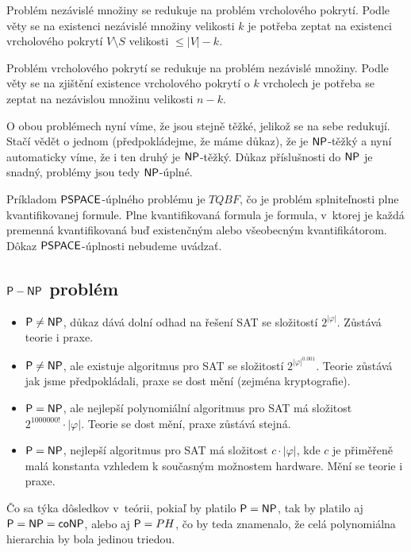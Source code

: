 Problém nezávislé množiny se redukuje na problém vrcholového pokrytí.
Podle věty se na existenci nezávislé množiny velikosti $k$
je potřeba zeptat na existenci vrcholového pokrytí
$V \setminus S$ velikosti $ \leq \lvert V \rvert - k$.

Problém vrcholového pokrytí se redukuje na problém nezávislé množiny.
Podle věty se na zjištění existence vrcholového pokrytí o $k$ vrcholech
je potřeba se zeptat na nezávislou množinu velikosti $n-k$.

O obou problémech nyní víme, že jsou stejně těžké, jelikož se na sebe
redukují. Stačí vědět o jednom (předpokládejme, že máme důkaz), že je
$\NP$-těžký a nyní automaticky víme, že i ten druhý je $\NP$-těžký.
Důkaz příslušnosti do $\NP$ je snadný, problémy jsou tedy $\NP$-úplné.

Príkladom $\PSPACE$-úplného problému je $TQBF$, čo je problém splniteľnosti
plne kvantifikovanej formule. Plne kvantifikovaná formula je formula,
v~ktorej je každá premenná kvantifikovaná buď existenčným alebo všeobecným
kvantifikátorom. Dôkaz $\PSPACE$-úplnosti nebudeme uvádzať.

\subsection{$\P-\NP$ problém}

\begin{itemize}
\item $\P \neq \NP$, důkaz dává dolní odhad na řešení SAT se složitostí
    $2^{\lvert\varphi\rvert}$.
    Zůstává teorie i praxe.

\item $\P \neq \NP$, ale existuje algoritmus pro SAT se složitostí
    $2^{\lvert\varphi\rvert^{0.001}}$.
    Teorie zůstává jak jsme předpokládali, praxe se
    dost mění (zejména kryptografie).

\item $\P = \NP$, ale nejlepší polynomiální algoritmus pro SAT má
    složitost $2^{1000000!} \cdot \lvert \varphi \rvert$.  Teorie se
    dost mění, praxe zůstává stejná.

\item $\P = \NP$, nejlepší algoritmus pro SAT má složitost
    $c \cdot \lvert \varphi \rvert$, kde $c$ je přiměřeně malá konstanta
    vzhledem k současným možnostem hardware.
    Mění se teorie i praxe.
\end{itemize}

Čo sa týka dôsledkov v~teórii, pokiaľ by platilo $\P = \NP$, tak by 
platilo aj $\P = \NP = \coNP$, alebo aj $\P = PH$, čo by teda znamenalo,
že celá polynomiálna hierarchia by bola jedinou triedou.

